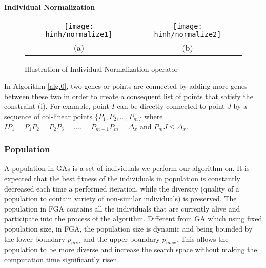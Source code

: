 \documentclass[final]{elsarticle}
\begin{document}
\begin{algorithm}[H]
	\SetAlgoLined
		\caption{\textbf{Individual Normalization}} 
		\label{alg.0}
\end{algorithm} 
\begin{figure*}[h]
	\begin{tabular}{cc}
		\texttt{[image: hinh/normalize1]}&\texttt{[image: hinh/normalize2]}\\
		(a) &(b)\\
	\end{tabular}
	\centering
	\caption{Illustration of Individual Normalization operator
	}
	\label{Fig.6}       %
\end{figure*}

In Algorithm \ref*{alg.0}, two genes or points are connected by adding more genes between these two in order to create a consequent list of points that satisfy the constraint (i). For example, point $ I $ can be directly connected to point $ J $ by a sequence of col-linear points $\{P_1,P_2,...,P_m\}$ where $IP_1=P_1P_2=P_2P_3=....=P_{m-1}P_m=\Delta_x$ and $P_mJ \leq \Delta_x$.\\

\subsubsection{Population}

A population in GAs is a set of individuals we perform our algorithm on. It is expected that the best fitness of the individuals in population is constantly decreased each time a performed iteration, while the diversity (quality of a population to contain variety of non-similar individuals) is preserved. The population in FGA contains all the individuals that are currently alive and participate into the process of the algorithm. Different from GA which using fixed population size, in FGA, the population size is dynamic and being bounded by the lower boundary $p_{min}$ and the upper boundary $p_{max}$. This allows the population to be more diverse and increase the search space without making the computation time significantly risen.
\end{document}
